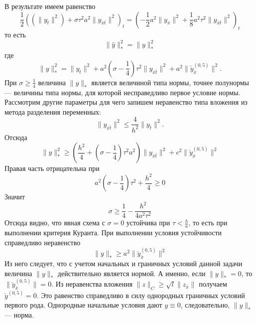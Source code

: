 \documentclass[12pt, a4paper]{article}
\newcommand{\widecheck}[1]{\check{#1}}
\newcommand{\down}[1]{\widecheck{#1}}
\begin{document}
	В результате имеем равенство
	\begin{equation*}
		\frac{1}{2}((\parallel y_{\bar{t}} \parallel^2) + \sigma \tau^2 a^2 \parallel y_{\bar{x}\bar{t}} \parallel^2)_t = (-\frac{1}{2} a^2 \parallel y_{\bar{x}} \parallel^2 + \frac{1}{8} a^2 \tau^2 \parallel y_{\bar{x}\bar{t}} \parallel^2)_t 
	\end{equation*}
	то есть
	\begin{equation*}
		\parallel \hat{y} \parallel^2_* = 	\parallel y \parallel^2_*
	\end{equation*}
	где 
	\begin{equation*}
		\parallel y \parallel^2_* = \parallel y_{\bar{t}} \parallel^2 + a^2(\sigma - \frac{1}{4}) \tau^2  \parallel y_{\bar{x}\bar{t}} \parallel^2 + a^2 \parallel \down{y}^{(0,5)}_{\bar{x}}\parallel^2.
	\end{equation*}
	При $\sigma\ge \frac{1}{4}$ величина $\parallel y \parallel_*$ является величиной типа нормы, точнее полунормы --- величины типа нормы, для которой несправедливо первое условие нормы. Рассмотрим другие параметры для чего запишем неравенство типа вложения из метода разделения переменных:
	\begin{equation*}
		\parallel y_{\bar{x}\bar{t}} \parallel^2 \le \frac{4}{h^2} \parallel y_{\bar{t}} \parallel^2.
	\end{equation*}
	Отсюда
	\begin{equation*}
		\parallel y \parallel^2_* \ge (\frac{h^2}{4} + (\sigma - \frac{1}{4}) \tau^2 a^2) \parallel y_{\bar{x}\bar{t}} \parallel^2 + c^2 \parallel \down{y}^{(0,5)}_{\bar{x}}\parallel^2
	\end{equation*}
	Правая часть отрицательна при
	\begin{equation*}
		a^2(\sigma - \frac{1}{4}) \tau^2 + \frac{h^2}{4} \ge 0
	\end{equation*}
	Значит
	\begin{equation*}
		\sigma \ge \frac{1}{4} - \frac{h^2}{4a^2 \tau^2}
	\end{equation*}
	Отсюда видно, что явная схема с $\sigma = 0$ устойчива при $\tau < \frac{h}{a}$, то есть при выполнении критерия Куранта. 
	При выполнении условия устойчивости справедливо неравенство
	\begin{equation*}
		\parallel y \parallel_* \ge a^2 \parallel \down{y}^{(0,5)}_{\bar{x}}\parallel^2
	\end{equation*}
	Из него следует, что с учетом начальных и граничных условий данной задачи величина $\parallel y \parallel_*$ действительно является нормой.  А именно, если $\parallel y \parallel_* = 0$, то $\parallel \down{y}^{(0,5)}_{\bar{x}}\parallel = 0$. Из неравенства вложения $\parallel z \parallel_C \ge \sqrt{l} \parallel z_{\bar{x}} \parallel$ получаем $\down{y}^{(0,5)} = 0$. Это равенство справедливо в силу однородных граничных условий первого рода. Однородные начальные условия дают $y \equiv 0$, следовательно,  $\parallel y \parallel_*$ --- норма.
	
\end{document}
